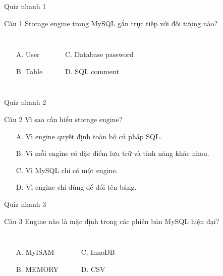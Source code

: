 \documentclass[aspectratio=169,11pt]{beamer}
\newcommand{\smallitem}{\setlength{\itemsep}{2pt}}
\begin{document}
\begin{frame}{Quiz nhanh 1}
\begin{block}{Câu 1}
Storage engine trong MySQL gắn trực tiếp với đối tượng nào?
\end{block}
\vspace{0.2cm}
\begin{columns}[T,onlytextwidth]
\begin{itemize}\smallitem
  \item[A.] User
  \item[B.] Table
\end{itemize}
\begin{itemize}\smallitem
  \item[C.] Database password
  \item[D.] SQL comment
\end{itemize}
\end{columns}
\end{frame}

\begin{frame}{Quiz nhanh 2}
\begin{block}{Câu 2}
Vì sao cần hiểu storage engine?
\end{block}
\vspace{0.2cm}
\begin{itemize}\smallitem
  \item[A.] Vì engine quyết định toàn bộ cú pháp SQL.
  \item[B.] Vì mỗi engine có đặc điểm lưu trữ và tính năng khác nhau.
  \item[C.] Vì MySQL chỉ có một engine.
  \item[D.] Vì engine chỉ dùng để đổi tên bảng.
\end{itemize}
\end{frame}

\begin{frame}{Quiz nhanh 3}
\begin{block}{Câu 3}
Engine nào là mặc định trong các phiên bản MySQL hiện đại?
\end{block}
\vspace{0.2cm}
\begin{columns}[T,onlytextwidth]
\begin{itemize}\smallitem
  \item[A.] MyISAM
  \item[B.] MEMORY
\end{itemize}
\begin{itemize}\smallitem
  \item[C.] InnoDB
  \item[D.] CSV
\end{itemize}
\end{columns}
\end{frame}
\end{document}
